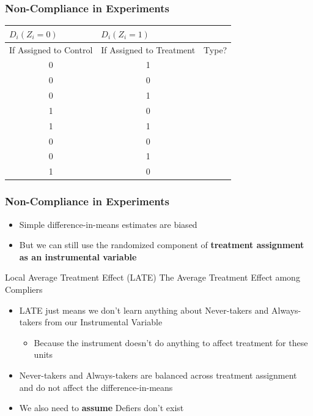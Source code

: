 \documentclass[xcolor=x11names,compress]{beamer}\usepackage[]{graphicx}\usepackage[]{color}
\renewcommand{\(}{\begin{columns}}
\renewcommand{\)}{\end{columns}}
\newcommand{\<}[1]{\begin{column}{#1}}
\renewcommand{\>}{\end{column}}
\begin{document}
\begin{frame}
\frametitle{Non-Compliance in Experiments}
\begin{table}[htbp]
  \centering
    \begin{tabular}{c|c|c}
    \multicolumn{1}{l}{$D_i(Z_i=0)$} & \multicolumn{1}{l}{$D_i(Z_i=1)$} & \multicolumn{1}{l}{} \\
    \hline
    \multicolumn{1}{l}{If Assigned to Control} & \multicolumn{1}{l}{If Assigned to Treatment} & \multicolumn{1}{l}{Type?} \\
    \hline
    0     & 1     &  \\
    0     & 0     &  \\
    0     & 1     &  \\
    1     & 0     &  \\
    1     & 1     &  \\
    0     & 0     &  \\
    0     & 1     &  \\
    1     & 0     &  \\
    \end{tabular}%
  \label{tab:addlabel}%
\end{table}%

\end{frame}

\begin{frame}
\frametitle{Non-Compliance in Experiments}
\begin{itemize}
\item Simple difference-in-means estimates are biased
\pause
\item But we can still use the randomized component of \textbf{treatment assignment as an instrumental variable}
\pause
\end{itemize}
\begin{block}{Local Average Treatment Effect (LATE)}
The Average Treatment Effect among Compliers
\end{block}
\begin{itemize}
\item LATE just means we don't learn anything about Never-takers and Always-takers from our Instrumental Variable
\pause
\begin{itemize}
\item Because the instrument doesn't do anything to affect treatment for these units
\end{itemize}
\pause
\item Never-takers and Always-takers are balanced across treatment assignment and do not affect the difference-in-means
\pause
\item We also need to \textbf{assume} Defiers don't exist
\end{itemize}
\end{frame}
\end{document}

